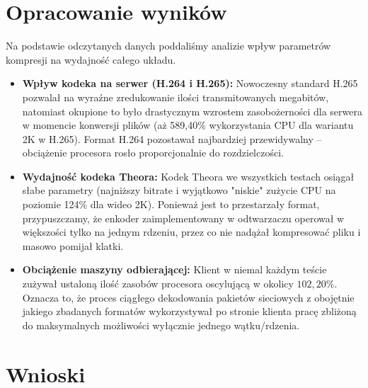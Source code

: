 \documentclass[11pt, a4paper]{article}
\begin{document}
\section{Opracowanie wyników}

Na podstawie odczytanych danych poddaliśmy analizie wpływ parametrów kompresji na wydajność całego układu. 

\begin{itemize}
    \item \textbf{Wpływ kodeka na serwer (H.264 i H.265):} 
    Nowoczesny standard H.265 pozwalał na wyraźne zredukowanie ilości transmitowanych megabitów, natomiast okupione to było drastycznym wzrostem zasobożerności dla serwera w momencie konwersji plików (aż 589,40\% wykorzystania CPU dla wariantu 2K w H.265). Format H.264 pozostawał najbardziej przewidywalny – obciążenie procesora rosło proporcjonalnie do rozdzielczości.
    
    \item \textbf{Wydajność kodeka Theora:} 
    Kodek Theora we wszystkich testach osiągał słabe parametry (najniższy bitrate i wyjątkowo "niskie" zużycie CPU na poziomie 124\% dla wideo 2K). Ponieważ jest to przestarzały format, przypuszczamy, że enkoder zaimplementowany w odtwarzaczu operował w większości tylko na jednym rdzeniu, przez co nie nadążał kompresować pliku i masowo pomijał klatki. 

    \item \textbf{Obciążenie maszyny odbierającej:}
    Klient w niemal każdym teście zużywał ustaloną ilość zasobów procesora oscylującą w okolicy $102,20\%$. Oznacza to, że proces ciągłego dekodowania pakietów sieciowych z obojętnie jakiego zbadanych formatów wykorzystywał po stronie klienta pracę zbliżoną do maksymalnych możliwości wyłącznie jednego wątku/rdzenia.
\end{itemize}


\section{Wnioski}
\end{document}
